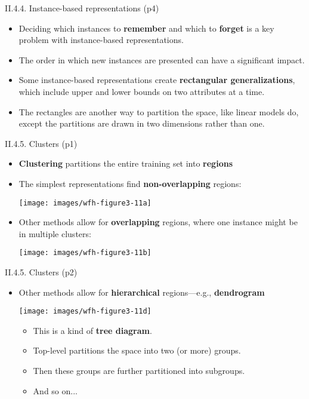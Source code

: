 \documentclass[handout]{beamer}
\newcommand{\strong}[1]{\textbf{\color{teal} #1}}
\begin{document}
\begin{frame}{II.4.4. Instance-based representations (p4)}
\begin{itemize}
\item Deciding which instances to \strong{remember} and which to \strong{forget} is a key problem with instance-based representations.
\item The order in which new instances are presented can have a significant impact.
\item Some instance-based representations create \strong{rectangular generalizations}, which include upper and lower bounds on two attributes at a time.
\item The rectangles are another way to partition the space, like linear models do, except the partitions are drawn in two dimensions rather than one.
\end{itemize}
\end{frame}
\begin{frame}{II.4.5. Clusters (p1)}
\begin{itemize}
\item \strong{Clustering} partitions the entire training set into \strong{regions}
\item The simplest representations find \strong{non-overlapping} regions:
\begin{center}
\texttt{[image: images/wfh-figure3-11a]}
\cite[Fig 3.11a]{WFH3:2011}
\end{center}
\item Other methods allow for \strong{overlapping} regions, where one instance might be in multiple clusters:
\begin{center}
\texttt{[image: images/wfh-figure3-11b]}
\cite[Fig 3.11b]{WFH3:2011}
\end{center}
\end{itemize}
\end{frame}
\begin{frame}{II.4.5. Clusters (p2)}
\begin{itemize}
\item Other methods allow for \strong{hierarchical} regions---e.g., \strong{dendrogram}
\begin{center}
\texttt{[image: images/wfh-figure3-11d]}
\cite[Fig 3.11d]{WFH3:2011}
\end{center}
	\begin{itemize}
	\item This is a kind of \strong{tree diagram}.
	\item Top-level partitions the space into two (or more) groups.
	\item Then these groups are further partitioned into subgroups.
	\item And so on...
	\end{itemize}
\end{itemize}
\end{frame}
\end{document}
